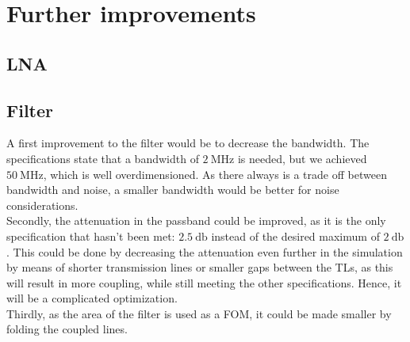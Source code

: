\documentclass[a4paper]{article}        %
\begin{document}
\section{Further improvements}

	\subsection{LNA}

	\subsection{Filter}
		A first improvement to the filter would be to decrease the bandwidth. The specifications state that a bandwidth of $\SI{2}{\mega\hertz}$ is needed, but we achieved $\SI{50}{\mega\hertz}$, which is well overdimensioned. As there always is a trade off between bandwidth and noise, a smaller bandwidth would be better for noise considerations. \\

		Secondly, the attenuation in the passband could be improved, as it is the only specification that hasn't been met: $\SI{2.5}{\decibel}$ instead of the desired maximum of $\SI{2}{\decibel}$. This could be done by decreasing the attenuation even further in the simulation by means of shorter transmission lines or smaller gaps between the TLs, as this will result in more coupling, while still meeting the other specifications. Hence, it will be a complicated optimization. \\

		Thirdly, as the area of the filter is used as a FOM, it could be made smaller by folding the coupled lines. 



\end{document}
